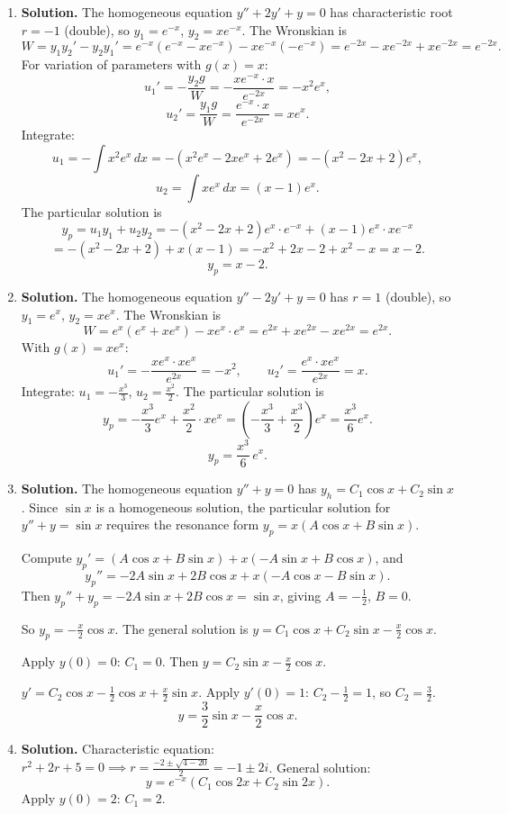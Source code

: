 \begin{enumerate}
\item \textbf{Solution.}
The homogeneous equation $y''+2y'+y=0$ has characteristic root $r=-1$ (double), so $y_1=e^{-x}$, $y_2=xe^{-x}$. The Wronskian is
\[
W = y_1 y_2'-y_2 y_1' = e^{-x}(e^{-x}-xe^{-x})-xe^{-x}(-e^{-x})=e^{-2x}-xe^{-2x}+xe^{-2x}=e^{-2x}.
\]
For variation of parameters with $g(x)=x$:
\[
u_1' = -\frac{y_2 g}{W}=-\frac{xe^{-x}\cdot x}{e^{-2x}}=-x^2 e^{x},
\]
\[
u_2' = \frac{y_1 g}{W}=\frac{e^{-x}\cdot x}{e^{-2x}}=xe^{x}.
\]
Integrate:
\[
u_1 = -\int x^2 e^x\,dx = -(x^2 e^x-2xe^x+2e^x) = -(x^2-2x+2)e^x,
\]
\[
u_2 = \int xe^x\,dx = (x-1)e^x.
\]
The particular solution is
\[
y_p = u_1 y_1+u_2 y_2 = -(x^2-2x+2)e^x\cdot e^{-x}+(x-1)e^x\cdot xe^{-x}
\]
\[
= -(x^2-2x+2)+x(x-1) = -x^2+2x-2+x^2-x = x-2.
\]
\[
\boxed{y_p = x-2}.
\]

\item \textbf{Solution.}
The homogeneous equation $y''-2y'+y=0$ has $r=1$ (double), so $y_1=e^x$, $y_2=xe^x$. The Wronskian is
\[
W = e^x(e^x+xe^x)-xe^x\cdot e^x = e^{2x}+xe^{2x}-xe^{2x}=e^{2x}.
\]
With $g(x)=xe^x$:
\[
u_1' = -\frac{xe^x\cdot xe^x}{e^{2x}}=-x^2, \qquad u_2' = \frac{e^x\cdot xe^x}{e^{2x}}=x.
\]
Integrate: $u_1=-\frac{x^3}{3}$, $u_2=\frac{x^2}{2}$. The particular solution is
\[
y_p = -\frac{x^3}{3}e^x+\frac{x^2}{2}\cdot xe^x = \left(-\frac{x^3}{3}+\frac{x^3}{2}\right)e^x = \frac{x^3}{6}e^x.
\]
\[
\boxed{y_p = \frac{x^3}{6}\,e^x}.
\]

\item \textbf{Solution.}
The homogeneous equation $y''+y=0$ has $y_h=C_1\cos x+C_2\sin x$. Since $\sin x$ is a homogeneous solution, the particular solution for $y''+y=\sin x$ requires the resonance form $y_p=x(A\cos x+B\sin x)$.

Compute $y_p'=(A\cos x+B\sin x)+x(-A\sin x+B\cos x)$, and
\[
y_p''=-2A\sin x+2B\cos x+x(-A\cos x-B\sin x).
\]
Then $y_p''+y_p = -2A\sin x+2B\cos x = \sin x$, giving $A=-\frac{1}{2}$, $B=0$.

So $y_p=-\frac{x}{2}\cos x$. The general solution is $y=C_1\cos x+C_2\sin x-\frac{x}{2}\cos x$.

Apply $y(0)=0$: $C_1=0$. Then $y=C_2\sin x-\frac{x}{2}\cos x$.

$y'=C_2\cos x-\frac{1}{2}\cos x+\frac{x}{2}\sin x$. Apply $y'(0)=1$: $C_2-\frac{1}{2}=1$, so $C_2=\frac{3}{2}$.
\[
\boxed{y = \frac{3}{2}\sin x - \frac{x}{2}\cos x}.
\]

\item \textbf{Solution.}
Characteristic equation: $r^2+2r+5=0 \implies r=\frac{-2\pm\sqrt{4-20}}{2}=-1\pm 2i$. General solution:
\[
y = e^{-x}(C_1\cos 2x+C_2\sin 2x).
\]
Apply $y(0)=2$: $C_1=2$.


\end{enumerate}
